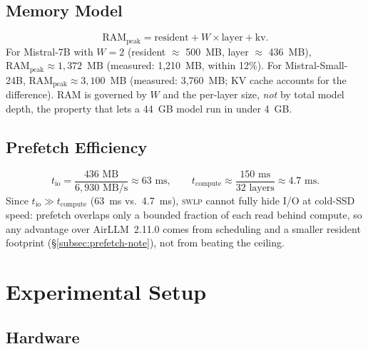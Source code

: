 \documentclass[10pt,a4paper]{article}
\newcommand{\swlp}{\textsc{swlp}}
\begin{document}
\subsection{Memory Model}
\label{subsec:memory}

\begin{equation}
\text{RAM}_{\text{peak}} = \text{resident} + W \times \text{layer} + \text{kv}.
\label{eq:ram}
\end{equation}
For Mistral-7B with $W=2$ (resident $\approx$ 500~MB, layer $\approx$ 436~MB),
$\text{RAM}_{\text{peak}} \approx 1{,}372$~MB (measured: 1{,}210~MB, within 12\%).
For Mistral-Small-24B, $\text{RAM}_{\text{peak}} \approx 3{,}100$~MB (measured:
3{,}760~MB; KV cache accounts for the difference). RAM is governed by $W$ and the
per-layer size, \emph{not} by total model depth, the property that lets a 44~GB
model run in under 4~GB.

\subsection{Prefetch Efficiency}
\label{subsec:prefetch}

\begin{equation}
t_{\text{io}} = \frac{436 \text{ MB}}{6{,}930 \text{ MB/s}} \approx 63 \text{ ms},
\qquad
t_{\text{compute}} \approx \frac{150 \text{ ms}}{32 \text{ layers}} \approx 4.7 \text{ ms}.
\label{eq:tio}
\end{equation}
Since $t_{\text{io}} \gg t_{\text{compute}}$ (63~ms vs.\ 4.7~ms), \swlp{} cannot
fully hide I/O at cold-SSD speed: prefetch overlaps only a bounded fraction of
each read behind compute, so any advantage over AirLLM~2.11.0 comes from
scheduling and a smaller resident footprint (\S\ref{subsec:prefetch-note}), not
from beating the ceiling.

\section{Experimental Setup}
\label{sec:setup}

\subsection{Hardware}
\label{subsec:hardware}
\end{document}
